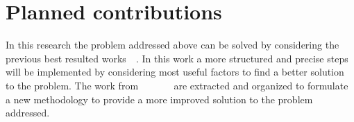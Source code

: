 \section{Planned contributions}
In this research the problem addressed above can be solved by considering the previous best resulted works~\cite{whitten1999johnny}~\cite{clark2007usability}. In this work a more structured and precise steps will be implemented by considering most useful factors to find a better solution to the problem. The work from ~\cite{whitten1999johnny}~\cite{clark2007usability}~\cite{furnell2006challenges}~\cite{dingledine2006anonymity}~\cite{kobeissi2013cryptocat}~\cite{katsabas2005using} are extracted and organized to formulate a new methodology to provide a more improved solution to the problem addressed.

